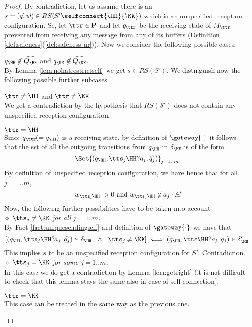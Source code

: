 \begin{proof}
By contradiction, let us assume there is an $s= (\vec{q},\vec{w})\in RS(S'\selfconnect{\HH}{\KK})$ which is an unspecified reception configuration.
So, let $\ttr \in \textbf{P}$ and let ${q}_\ttr$  be the receiving state of $M_\ttr$ prevented from 
receiving any message from any of its buffers (Definition \ref{def:safeness}(\ref{def:safeness-ur})).
Now we  consider the following possible cases:

\begin{description}
\item 
${q}_\HH\not\in \widehat{Q_\HH}$ and ${q}_\KK\not\in \widehat{Q_\KK}$.\\ 
By Lemma \ref{lem:nohatrestrictself} we get ${s}\in RS(S')$. 
We distinguish now the following possible further subcases.
\begin{description}
\item 
$\ttr \neq \HH$ and $\ttr \neq \KK$\\
We get a contradiction by the hypothesis that $RS(S')$ does not contain any unspecified reception configuration.
\item 
$\ttr = \HH$\\
Since ${q}_\ttr(= {q}_\HH)$ is a receiving state,
by definition of $\gateway{\cdot}$ it follows that
 the set
of all the outgoing transitions from $q_\HH$ in $\delta_\HH$ is of the form 
$$\Set{({q}_\HH,\tts_j\HH?a_j,\widehat{q_j})}_{j=1..m}$$
By definition of unspecified reception configuration,  we have hence that for all $j=1..m$, 
$$\mid w_{\tts_j\HH}\mid > 0 
\text{ and } w_{\tts_j\HH}\not\in  a_j\cdot\mathbb{A}^*$$
Now, the following further possibilities have to be taken into account\\
\underline{$\diamond$} {\it  $\tts_j\neq\KK$ for all  $j=1..m$.}\\
By Fact \ref{fact:uniquesendingself} and definition of $\gateway{\cdot}$ we have that  
$$[(q_\HH,\tts_j\HH?a_j,\widehat{q_j})\in\delta_\HH  ~~\wedge ~~
\tts_j\neq\KK] \iff  
(q_\HH,\tts\HH?a_j,q_j)\in\delta'_\HH$$
 This implies $s$ to be an  unspecified reception configuration for $S'$. Contradiction.\\
\underline{$\diamond$} {\it $\tts_j = \KK$ for some $j=1..m$.} \\
In this case we do get a contradiction by Lemma \ref{lem:getright} (it is not difficult to check that this lemma stays the
same also in case of self-connection).
\item 
$\ttr = \KK$\\
This case can be treated in the same way as the previous one.
\end{description}



\end{description}
\end{proof}

